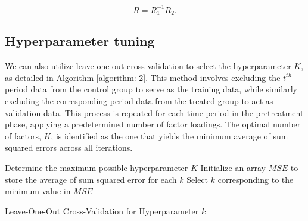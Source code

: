 \documentclass[12pt]{article}
\begin{document}
\begin{equation}
R = R_1^{-1}R_2.
\end{equation}

\subsection{Hyperparameter tuning}
\label{sec: appendix hyperparameter}
We can also utilize leave-one-out cross validation to select the hyperparameter $K$, as detailed in Algorithm \ref{algorithm: 2}. This method involves excluding the $t^{th}$ period data from the control group to serve as the training data, while similarly excluding the corresponding period data from the treated group to act as validation data. This process is repeated for each time period in the pretreatment phase, applying a predetermined number of factor loadings. The optimal number of factors, $K$, is identified as the one that yields the minimum average of sum squared errors across all iterations.

\begin{algorithm}[!ht]
    \SetAlgoLined
    Determine the maximum possible hyperparameter $K$\;
    Initialize an array $MSE$ to store the average of sum squared error for each $k$\;
      Select $k$ corresponding to the minimum value in $MSE$\;
    \caption{Leave-One-Out Cross-Validation for Hyperparameter $k$}
    \label{algorithm: 2}
\end{algorithm}
\end{document}
